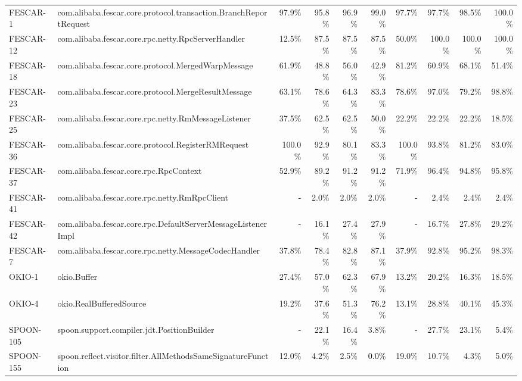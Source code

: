 \begin{tabular}{ ll rrrr rrrr}
FESCAR-1  &  com.alibaba.fescar.core.protocol.transaction.BranchReportRequest & 97.9\% & 95.8\% & 96.9\% & 99.0\% & 97.7\% & 97.7\% & 98.5\% & 100.0\%\\ 
FESCAR-12  &  com.alibaba.fescar.core.rpc.netty.RpcServerHandler & 12.5\% & 87.5\% & 87.5\% & 87.5\% & 50.0\% & 100.0\% & 100.0\% & 100.0\%\\ 
FESCAR-18  &  com.alibaba.fescar.core.protocol.MergedWarpMessage & 61.9\% & 48.8\% & 56.0\% & 42.9\% & 81.2\% & 60.9\% & 68.1\% & 51.4\%\\ 
FESCAR-23  &  com.alibaba.fescar.core.protocol.MergeResultMessage & 63.1\% & 78.6\% & 64.3\% & 83.3\% & 78.6\% & 97.0\% & 79.2\% & 98.8\%\\ 
FESCAR-25  &  com.alibaba.fescar.core.rpc.netty.RmMessageListener & 37.5\% & 62.5\% & 62.5\% & 50.0\% & 22.2\% & 22.2\% & 22.2\% & 18.5\%\\ 
FESCAR-36  &  com.alibaba.fescar.core.protocol.RegisterRMRequest & 100.0\% & 92.9\% & 80.1\% & 83.3\% & 100.0\% & 93.8\% & 81.2\% & 83.0\%\\ 
FESCAR-37  &  com.alibaba.fescar.core.rpc.RpcContext & 52.9\% & 89.2\% & 91.2\% & 91.2\% & 71.9\% & 96.4\% & 94.8\% & 95.8\%\\ 
FESCAR-41  &  com.alibaba.fescar.core.rpc.netty.RmRpcClient & \cellcolor{light-gray} \textcolor{black}{-} & 2.0\% & 2.0\% & 2.0\% & \cellcolor{light-gray} \textcolor{black}{-} & 2.4\% & 2.4\% & 2.4\%\\ 
FESCAR-42  &  com.alibaba.fescar.core.rpc.DefaultServerMessageListenerImpl & \cellcolor{light-gray} \textcolor{black}{-} & 16.1\% & 27.4\% & 27.9\% & \cellcolor{light-gray} \textcolor{black}{-} & 16.7\% & 27.8\% & 29.2\%\\ 
FESCAR-7  &  com.alibaba.fescar.core.rpc.netty.MessageCodecHandler & 37.8\% & 78.4\% & 82.8\% & 87.1\% & 37.9\% & 92.8\% & 95.2\% & 98.3\%\\ 
OKIO-1  &  okio.Buffer & 27.4\% & 57.0\% & 62.3\% & 67.9\% & 13.2\% & 20.2\% & 16.3\% & 18.5\%\\ 
OKIO-4  &  okio.RealBufferedSource & 19.2\% & 37.6\% & 51.3\% & 76.2\% & 13.1\% & 28.8\% & 40.1\% & 45.3\%\\ 
SPOON-105  &  spoon.support.compiler.jdt.PositionBuilder & \cellcolor{light-gray} \textcolor{black}{-} & 22.1\% & 16.4\% & 3.8\% & \cellcolor{light-gray} \textcolor{black}{-} & 27.7\% & 23.1\% & 5.4\%\\ 
SPOON-155  &  spoon.reflect.visitor.filter.AllMethodsSameSignatureFunction & 12.0\% & 4.2\% & 2.5\% & \cellcolor{light-gray} \textcolor{black}{0.0\%} & 19.0\% & 10.7\% & 4.3\% & 5.0\%\\ 

\end{tabular}
